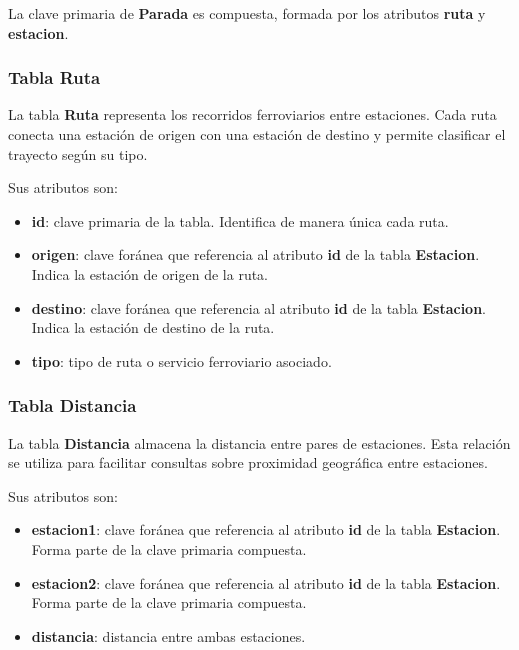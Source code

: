 La clave primaria de \textbf{Parada} es compuesta, formada por los
atributos \textbf{ruta} y \textbf{estacion}.

\subsubsection{Tabla Ruta}\label{tabla-ruta}

La tabla \textbf{Ruta} representa los recorridos ferroviarios entre
estaciones. Cada ruta conecta una estación de origen con una estación de
destino y permite clasificar el trayecto según su tipo.

Sus atributos son:

\begin{itemize}
\tightlist
\item
  \textbf{id}: clave primaria de la tabla. Identifica de manera única
  cada ruta.
\item
  \textbf{origen}: clave foránea que referencia al atributo \textbf{id}
  de la tabla \textbf{Estacion}. Indica la estación de origen de la
  ruta.
\item
  \textbf{destino}: clave foránea que referencia al atributo \textbf{id}
  de la tabla \textbf{Estacion}. Indica la estación de destino de la
  ruta.
\item
  \textbf{tipo}: tipo de ruta o servicio ferroviario asociado.
\end{itemize}

\subsubsection{Tabla Distancia}\label{tabla-distancia}

La tabla \textbf{Distancia} almacena la distancia entre pares de
estaciones. Esta relación se utiliza para facilitar consultas sobre
proximidad geográfica entre estaciones.

Sus atributos son:

\begin{itemize}
\tightlist
\item
  \textbf{estacion1}: clave foránea que referencia al atributo
  \textbf{id} de la tabla \textbf{Estacion}. Forma parte de la clave
  primaria compuesta.
\item
  \textbf{estacion2}: clave foránea que referencia al atributo
  \textbf{id} de la tabla \textbf{Estacion}. Forma parte de la clave
  primaria compuesta.
\item
  \textbf{distancia}: distancia entre ambas estaciones.
\end{itemize}

